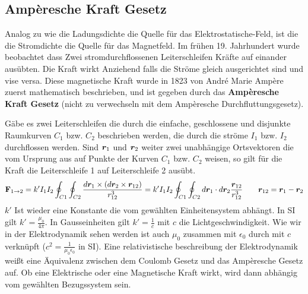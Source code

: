 \subsection{Ampèresche Kraft Gesetz}%
\label{sub:amperesche-gesetz}
Analog zu wie die Ladungsdichte die Quelle für das Elektrostatische-Feld, ist
die die Stromdichte die Quelle für das Magnetfeld. Im frühen 19. Jahrhundert wurde beobachtet dass Zwei stromdurchflossenen Leiterschleifen Kräfte auf einander ausübten. Die Kraft wirkt Anziehend falls die Ströme gleich ausgerichtet sind und vise versa. Diese magnetische Kraft wurde in 1823 von André Marie Ampère zuerst mathematisch beschrieben, und ist gegeben durch das \textbf{Ampèresche Kraft Gesetz} (nicht zu verwechseln
mit dem Ampèresche Durchfluttungsgesetz).

Gäbe es zwei Leiterschleifen die durch die einfache, geschlossene und disjunkte Raumkurven $C_1$ bzw. $C_2$ beschrieben werden, die durch die ströme $I_1$ bzw. $I_2$ durchflossen werden.
Sind $\vb*r_1$ und $\vb*r_2$ weiter zwei unabhängige Ortsvektoren die vom Ursprung
aus auf Punkte der Kurven $C_1$ bzw. $C_2$ weisen, so gilt für die Kraft die
Leiterschleife 1 auf Leiterschleife 2 ausübt. 
\begin{equation} 
  \vb F_{1\to2}=k'I_1I_2\oint_{C1}\oint_{C2} \frac{d\vb*r_1\times(d\vb*r_2
  \times \vb*r_{12})}{r_{12}^3}=k'I_1I_2\oint_{C1}\oint_{C2} d\vb*r_1 \cdot d\vb*r_2 \frac{\vb*r_{12}}{r_{12}^3} \qquad \vb*r_{12}=\vb*r_1-\vb*r_2
\end{equation}
$k'$ Ist wieder eine
Konstante die vom gewählten Einheitensystem abhängt. In SI gilt $k'=\frac{\mu_0}{4\pi}$. In Gausseinheiten gilt $k'=\frac{1}{c}$ mit $c$ die
Lichtgeschwindigkeit. Wie wir in der Elektrodynamik sehen werden ist auch $\mu_0$ zusammen mit $\epsilon_0$ durch mit $c$ verknüpft ($c^2=\frac{1}{\mu_0\epsilon_0}$ in SI). Eine relativistische beschreibung der Elektrodynamik weißt eine Äquivalenz zwischen dem Coulomb Gesetz und
das Ampèresche Gesetz auf. Ob eine Elektrische oder eine Magnetische Kraft
wirkt, wird dann abhängig vom gewählten Bezugssystem sein.

